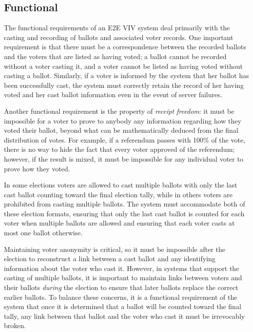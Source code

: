 \subsection{Functional} 
  The functional requirements of an E2E VIV
system deal primarily with the casting and recording of ballots and
associated voter records. One important requirement is that there must
be a correspondence between the recorded ballots and the voters that
are listed as having voted; a ballot cannot be recorded without a
voter casting it, and a voter cannot be listed as having voted without
casting a ballot. Similarly, if a voter is informed by the system that
her ballot has been successfully cast, the system must correctly
retain the record of her having voted and her cast ballot information
even in the event of server failures.

Another functional requirement is the property of \emph{receipt
  freedom}: it must be impossible for a voter to prove to anybody any
information regarding how they voted their ballot, beyond what can be
mathematically deduced from the final distribution of votes. For
example, if a referendum passes with 100\% of the vote, there is no
way to hide the fact that every voter approved of the referendum;
however, if the result is mixed, it must be impossible for any
individual voter to prove how they voted.

In some elections voters are allowed to cast multiple ballots with
only the last cast ballot counting toward the final election tally,
while in others voters are prohibited from casting multiple
ballots. The system must accommodate both of these election formats,
ensuring that only the last cast ballot is counted for each voter when
multiple ballots are allowed and ensuring that each voter casts at
most one ballot otherwise.

Maintaining voter anonymity is critical, so it must be impossible
after the election to reconstruct a link between a cast ballot and any
identifying information about the voter who cast it. However, in
systems that support the casting of multiple ballots, it is important
to maintain links between voters and their ballots \emph{during} the
election to ensure that later ballots replace the correct earlier
ballots. To balance these concerns, it is a functional requirement of
the system that once it is determined that a ballot will be counted
toward the final tally, any link between that ballot and the voter who
cast it must be irrevocably broken.

